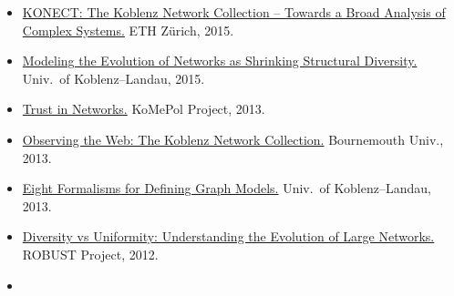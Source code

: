 \documentclass[line,mm]{res}
\newcounter{x}
\newcounter{y}
\newcommand{\talknumber}{T\arabic{y}\stepcounter{y}}
\newcounter{z}
\begin{document}
\begin{resume}
\begin{itemize}
{      \href{https://sites.google.com/site/icwsmscienceslam/}{\faStar}
      \href{https://www.youtube.com/watch?v=OxwsmNp3LFw}{\faVideoCamera}}
    \href{https://www.slideshare.net/kunegis/science-slam-by-jrme-kunegis-icwsm-2016}{It's Really about Hamsters.}
    Int.\ Conf.\ on Weblogs and Soc.\ Media Sci.\ Slam, 2016.  (Won First Prize)
  \item[{[\talknumber]}] 
    \href{https://github.com/kunegis/pdfs/blob/master/kunegis:konect-eth.presentation.pdf}{KONECT:
      The Koblenz Network Collection -- Towards a Broad Analysis of Complex Systems.}  ETH Zürich, 2015.
  \item[{[\talknumber]}] 
    \href{https://github.com/kunegis/pdfs/blob/master/kunegis:shrinking-diversity.presentation.pdf}{Modeling
      the Evolution of Networks as Shrinking 
      Structural Diversity.}  Univ.\ of Koblenz--Landau, 2015. 
  \item[{[\talknumber]}]
    \href{https://github.com/kunegis/pdfs/blob/master/kunegis:konect-komepol.presentation.pdf}{Trust in Networks.}
    KoMePol Project, 2013. 
  \item[{[\talknumber]}] 
    \href{https://github.com/kunegis/pdfs/blob/master/kunegis:konect-bournemouth.presentation.pdf}{Observing
      the Web: The Koblenz Network Collection.}  Bournemouth Univ., 2013.
  \item[{[\talknumber]}] 
    \href{https://www.slideshare.net/kunegis/eight-ways}{Eight
      Formalisms for Defining Graph Models.}  Univ.\ of Koblenz--Landau,
    2013.  
  \item[{[\talknumber]}]
    \href{https://github.com/kunegis/pdfs/blob/master/kunegis:diversity-uniformity.presentation.pdf}{Diversity
      vs Uniformity:  Understanding the Evolution of Large Networks.}
    ROBUST Project, 2012. 
  \item[{[\talknumber]}] 

\end{itemize}
\end{resume}
\end{document}
